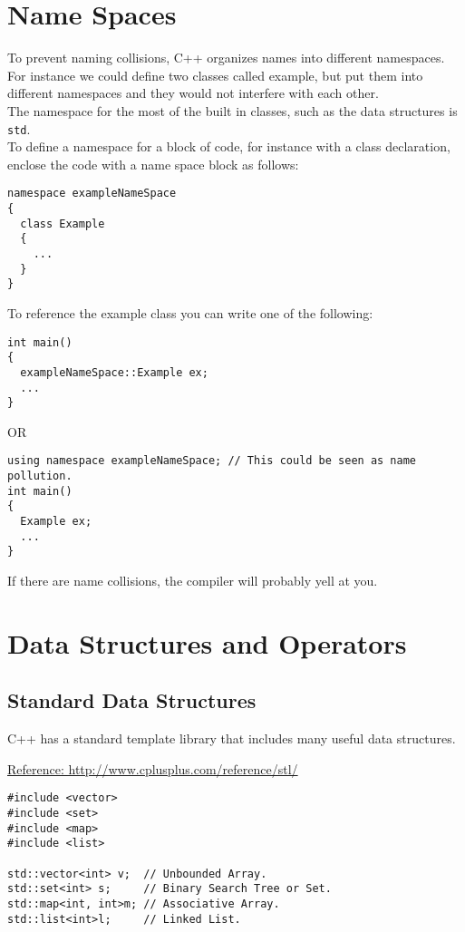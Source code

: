 \documentclass[12pt, letterpaper]{article}
\begin{document}
\section{Name Spaces}

To prevent naming collisions, C++ organizes names into different namespaces. For instance we could define two classes called example, but put them into different namespaces and they would not interfere with each other.\\

The namespace for the most of the built in classes, such as the data structures is \texttt{std}.\\

To define a namespace for a block of code, for instance with a class declaration, enclose the code with a name space block as follows:
\begin{verbatim}
namespace exampleNameSpace
{
  class Example
  {
    ...
  }
}
\end{verbatim}

To reference the example class you can write one of the following:

\begin{verbatim}
int main()
{
  exampleNameSpace::Example ex;
  ...
}
\end{verbatim}

OR

\begin{verbatim}
using namespace exampleNameSpace; // This could be seen as name pollution.
int main()
{
  Example ex;
  ...
}
\end{verbatim}

If there are name collisions, the compiler will probably yell at you.

\section{Data Structures and Operators}

\subsection{Standard Data Structures}

C++ has a standard template library that includes many useful data structures.

\href{http://www.cplusplus.com/reference/stl/}{Reference: http://www.cplusplus.com/reference/stl/}

\begin{verbatim}
#include <vector>
#include <set>
#include <map>
#include <list>

std::vector<int> v;  // Unbounded Array.
std::set<int> s;     // Binary Search Tree or Set.
std::map<int, int>m; // Associative Array.
std::list<int>l;     // Linked List.
\end{verbatim}
\end{document}
